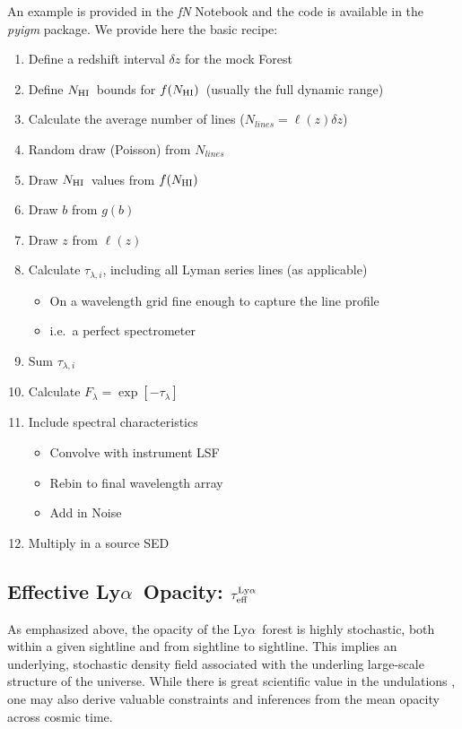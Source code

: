 \documentclass[graybox]{svmult}
\def\lya{Ly$\alpha$}
\newcommand{\mnhi}{N_{\rm HI}}
\newcommand{\nhi}{$\mnhi$}
\def\mfnhi{f(\mnhi)}
\def\fnhi{$\mfnhi$}
\begin{document}
An example is provided in the {\it fN} Notebook and the
code is available in the {\it pyigm} package.  We provide
here the basic recipe:

\begin{enumerate}
		\item Define a redshift interval $\delta z$ for the mock Forest
		\item Define \nhi\ bounds for \fnhi\ (usually the full dynamic range)
		\item Calculate the average number of lines 
		($N_{lines} = \ell(z) \delta z$)
		\item Random draw (Poisson) from $N_{lines}$
		\item Draw \nhi\ values from \fnhi
		\item Draw $b$ from $g(b)$
		\item Draw $z$ from $\ell(z)$
		\item Calculate $\tau_{\lambda,i}$, including all 
		Lyman series lines (as applicable)
			\begin{itemize}
			\item On a wavelength grid fine enough to 
			capture the line profile
			\item i.e.\ a perfect spectrometer
			\end{itemize}
		\item Sum $\tau_{\lambda,i}$
		\item Calculate $F_\lambda = \exp[-\tau_\lambda]$
		\item Include spectral characteristics
			\begin{itemize}
			\item Convolve with instrument LSF
			\item Rebin to final wavelength array
			\item Add in Noise
			\end{itemize}
		\item Multiply in a source SED
\end{enumerate}

\subsection{Effective \lya\ Opacity: $\tau_{\rm eff}^{\rm Ly\alpha}$}
\label{sec:teff_lya}
As emphasized above, the opacity of the \lya\ forest
is highly stochastic, both within a given sightline and
from sightline to sightline.
This implies an underlying, stochastic density field
associated with the underling large-scale structure of the
universe.  While there is great scientific value in the
undulations \cite[e.g.][]{lee+15}, one may also derive
valuable constraints and inferences from the mean opacity across
cosmic time.  
\end{document}
